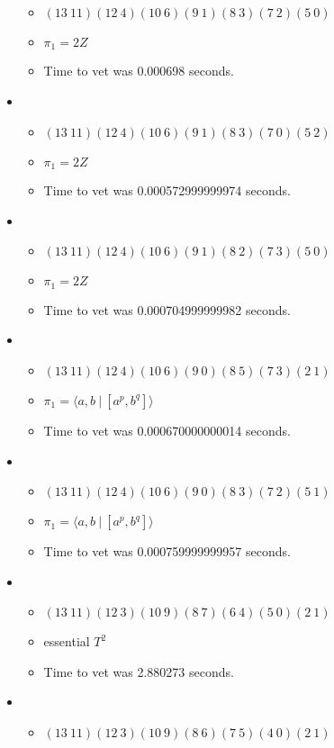 \documentclass{article}
\begin{document}
\begin{itemize}
\begin{itemize}
      \item $(13\ 11)(12\ 4)(10\ 6)(9\ 1)(8\ 3)(7\ 2)(5\ 0)$
      \item $\pi_1 =2 Z$
      \item Time to vet was 0.000698 seconds.
\end{itemize}
\item \begin{itemize}
      \item $(13\ 11)(12\ 4)(10\ 6)(9\ 1)(8\ 3)(7\ 0)(5\ 2)$
      \item $\pi_1 =2 Z$
      \item Time to vet was 0.000572999999974 seconds.
\end{itemize}
\item \begin{itemize}
      \item $(13\ 11)(12\ 4)(10\ 6)(9\ 1)(8\ 2)(7\ 3)(5\ 0)$
      \item $\pi_1 =2 Z$
      \item Time to vet was 0.000704999999982 seconds.
\end{itemize}
\item \begin{itemize}
      \item $(13\ 11)(12\ 4)(10\ 6)(9\ 0)(8\ 5)(7\ 3)(2\ 1)$
      \item $\pi_1 = \langle a,b\ |\ [a^p,b^q]\rangle$
      \item Time to vet was 0.000670000000014 seconds.
\end{itemize}
\item \begin{itemize}
      \item $(13\ 11)(12\ 4)(10\ 6)(9\ 0)(8\ 3)(7\ 2)(5\ 1)$
      \item $\pi_1 = \langle a,b\ |\ [a^p,b^q]\rangle$
      \item Time to vet was 0.000759999999957 seconds.
\end{itemize}
\item \begin{itemize}
      \item $(13\ 11)(12\ 3)(10\ 9)(8\ 7)(6\ 4)(5\ 0)(2\ 1)$
      \item essential $T^2$
      \item Time to vet was 2.880273 seconds.
\end{itemize}
\item \begin{itemize}
      \item $(13\ 11)(12\ 3)(10\ 9)(8\ 6)(7\ 5)(4\ 0)(2\ 1)$

\end{itemize}
\end{itemize}
\end{document}
